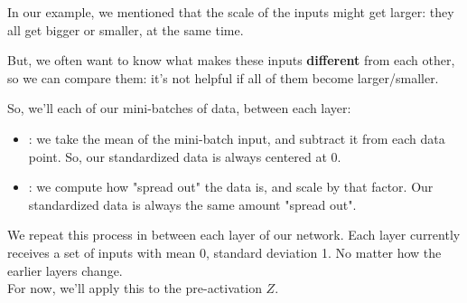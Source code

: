             In our example, we mentioned that the scale of the inputs might get larger: they all get bigger or smaller, at the same time.

            But, we often want to know what makes these inputs \textbf{different} from each other, so we can compare them: it's not helpful if all of them become larger/smaller.

            So, we'll  each of our mini-batches of data, between each layer:

            \begin{itemize}
                \item {}: we take the mean of the mini-batch input, and subtract it from each data point. So, our standardized data is always centered at 0.

                \item {}: we compute how "spread out" the data is, and scale by that factor. Our standardized data is always the same amount "spread out".
            \end{itemize}

            We repeat this process in between each layer of our network. Each layer currently receives a set of inputs with mean 0, standard deviation 1. No matter how the earlier layers change.
                \\

            For now, we'll apply this to the pre-activation $Z$.\\

